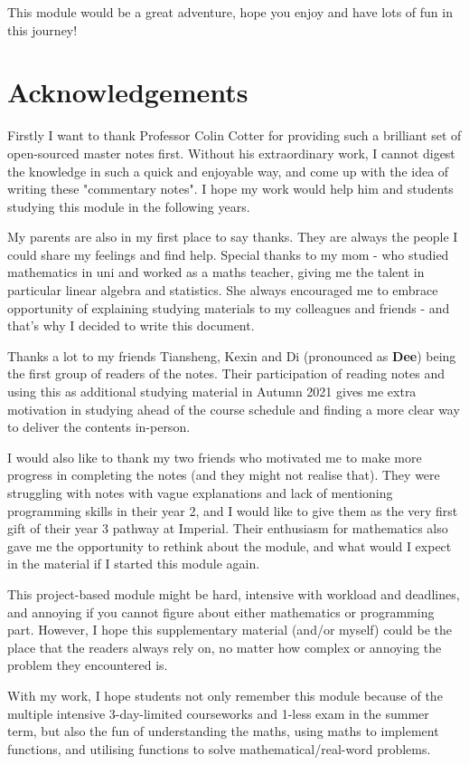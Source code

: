 \documentclass[a4paper,11pt,twoside]{report}
\begin{document}
This module would be a great adventure, hope you enjoy and have lots of fun in this journey!

\chapter*{Acknowledgements}
Firstly I want to thank Professor Colin Cotter for providing such a brilliant set of open-sourced master notes first.
Without his extraordinary work, I cannot digest the knowledge in such a quick and enjoyable way, and come up with the idea of writing these "commentary notes". 
I hope my work would help him and students studying this module in the following years.\smallskip

My parents are also in my first place to say thanks. They are always the people I could share my feelings and find help. Special thanks to my mom - who studied mathematics in uni and worked as a maths teacher, giving me the talent in particular linear algebra and statistics. She always encouraged me to embrace opportunity of explaining studying materials to my colleagues and friends - and that's why I decided to write this document.\smallskip

Thanks a lot to my friends Tiansheng, Kexin and Di (pronounced as \textbf{Dee}) being the first group of readers of the notes. Their participation of reading notes and using this as additional studying material in Autumn 2021 gives me extra motivation in studying ahead of the course schedule and finding a more clear way to deliver the contents in-person.\smallskip

I would also like to thank my two friends who motivated me to make more progress in completing the notes (and they might not realise that). They were struggling with notes with vague explanations and lack of mentioning programming skills in their year 2, and I would like to give them as the very first gift of their year 3 pathway at Imperial. Their enthusiasm for mathematics also gave me the opportunity to rethink about the module, and what would I expect in the material if I started this module again.\smallskip

This project-based module might be hard, intensive with workload and deadlines, and annoying if you cannot figure about either mathematics or programming part. However, I hope this supplementary material (and/or myself) could be the place that the readers always rely on, no matter how complex or annoying the problem they encountered is.\smallskip

With my work, I hope students not only remember this module because of the multiple intensive 3-day-limited courseworks and 1-less exam in the summer term, but also the fun of understanding the maths, using maths to implement functions, and utilising functions to solve mathematical/real-word problems.
\tableofcontents
\listoffigures
\end{document}
